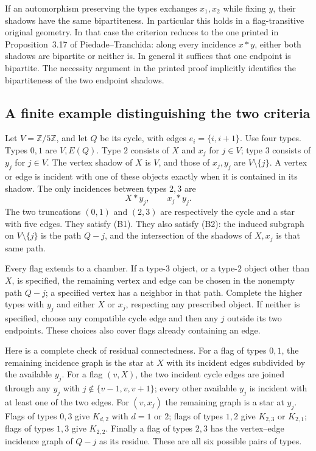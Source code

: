 If an automorphism preserving the types exchanges $x_1,x_2$ while
fixing $y$, their shadows have the same bipartiteness. In particular
this holds in a flag-transitive original geometry. In that case the
criterion reduces to the one printed in Proposition~3.17 of
Piedade--Tranchida: along every incidence $x*y$, either both shadows
are bipartite or neither is. In general it suffices that one endpoint
is bipartite. The necessity argument in the printed proof implicitly
identifies the bipartiteness of the two endpoint shadows.

\subsection*{A finite example distinguishing the two criteria}
Let $V=\mathbb Z/5\mathbb Z$, and let $Q$ be its cycle, with edges
$e_i=\{i,i+1\}$. Use four types. Types $0,1$ are $V,E(Q)$.
Type $2$ consists of $X$ and $x_j$ for $j\in V$; type $3$ consists
of $y_j$ for $j\in V$. The vertex shadow of $X$ is $V$, and those
of $x_j,y_j$ are $V\setminus\{j\}$. A vertex or edge is incident
with one of these objects exactly when it is contained in its shadow.
The only incidences between types $2,3$ are
\[
                          X*y_j,\qquad x_j*y_j.
\]
The two truncations $(0,1)$ and $(2,3)$ are respectively the cycle
and a star with five edges. They satisfy (B1). They also satisfy (B2):
the induced subgraph on $V\setminus\{j\}$ is the path $Q-j$, and
the intersection of the shadows of $X,x_j$ is that same path.

Every flag extends to a chamber. If a type-$3$ object, or a type-$2$
object other than $X$, is specified, the remaining vertex and edge
can be chosen in the nonempty path $Q-j$; a specified vertex has
a neighbor in that path. Complete the higher types with $y_j$ and
either $X$ or $x_j$, respecting any prescribed object. If neither
is specified, choose any compatible cycle
edge and then any $j$ outside its two endpoints. These choices also
cover flags already containing an edge.

Here is a complete check of residual connectedness. For a flag of
types $0,1$, the remaining incidence graph is the star at $X$ with
its incident edges subdivided by the available $y_j$. For a flag
$(v,X)$, the two incident cycle edges are joined through any $y_j$
with $j\notin\{v-1,v,v+1\}$; every other available $y_j$ is
incident with at least one of the two edges. For $(v,x_j)$ the
remaining graph is a star at $y_j$. Flags of types $0,3$ give
$K_{d,2}$ with $d=1$ or $2$; flags of types $1,2$ give $K_{2,3}$
or $K_{2,1}$; flags of types $1,3$ give $K_{2,2}$. Finally a flag
of types $2,3$ has the vertex--edge incidence graph of $Q-j$ as
its residue. These are all six possible pairs of types.

